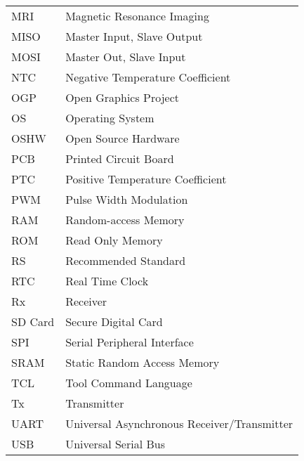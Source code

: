 \begin{tabular}{ll} \\
MRI & Magnetic Resonance Imaging \\
MISO & Master Input, Slave Output \\
MOSI & Master Out, Slave Input \\
NTC & Negative Temperature Coefficient \\
OGP & Open Graphics Project \\
OS & Operating System \\
OSHW & Open Source Hardware \\
PCB & Printed Circuit Board \\
PTC & Positive Temperature Coefficient \\
PWM & Pulse Width Modulation \\
RAM & Random-access Memory \\
ROM & Read Only Memory \\
RS & Recommended Standard \\
RTC & Real Time Clock \\
Rx & Receiver \\
SD Card & Secure Digital Card \\
SPI & Serial Peripheral Interface \\
SRAM & Static Random Access Memory \\
TCL & Tool Command Language \\
Tx & Transmitter \\
UART & Universal Asynchronous Receiver/Transmitter \\
USB & Universal Serial Bus \\
\end{tabular}
